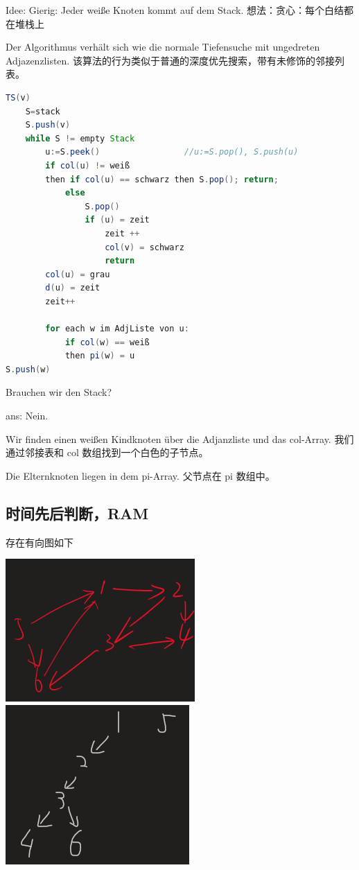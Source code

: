 \documentclass[a4paper]{article}    %
\begin{document}
Idee: Gierig: Jeder weiße Knoten kommt auf dem Stack.
想法：贪心：每个白结都在堆栈上

Der Algorithmus verhält sich wie die normale Tiefensuche mit ungedreten Adjazenzlisten.
该算法的行为类似于普通的深度优先搜索，带有未修饰的邻接列表。

\begin{lstlisting}[language=java]
TS(v)
	S=stack
	S.push(v)
	while S != empty Stack
		u:=S.peek()                 //u:=S.pop(), S.push(u)
		if col(u) != weiß
		then if col(u) == schwarz then S.pop(); return;
			else 
				S.pop()
				if (u) = zeit
					zeit ++
					col(v) = schwarz
					return
		col(u) = grau
		d(u) = zeit
		zeit++
		
		for each w im AdjListe von u:
			if col(w) == weiß
			then pi(w) = u
S.push(w)
\end{lstlisting}

\noindent Brauchen wir den Stack?

ans: Nein.

	Wir finden einen weißen Kindknoten über die Adjanzliste und das col-Array.
    我们通过邻接表和 col 数组找到一个白色的子节点。

	Die Elternknoten liegen in dem pi-Array. 
    父节点在 pi 数组中。

\subsection{时间先后判断，RAM}

\noindent 存在有向图如下

\begin{center}
    \includegraphics[scale=0.6]{16.png}
    \includegraphics[scale=0.6]{17.png}
\end{center}
\end{document}
